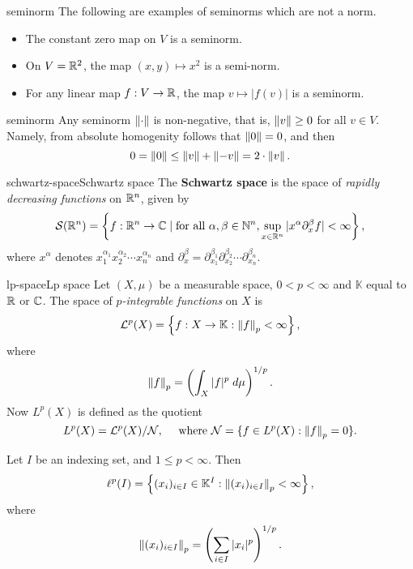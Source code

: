 \begin{example}{seminorm}
    The following are examples of seminorms which are not a norm.
    \begin{itemize}
        \item The constant zero map on $V$ is a seminorm.
        \item On $V = \mathbb{R}^2$, the map $(x, y) \mapsto x^2$ is a semi-norm.
        \item For any linear map $f : V \to \mathbb{R}$, the map $v \mapsto |f(v)|$ is a seminorm.
    \end{itemize}
\end{example}

\begin{example}{seminorm}
    Any seminorm $\left\|\cdot\right\|$ is non-negative, that is, $\left\|v\right\| \ge 0$ for all $v \in V$. Namely, from absolute homogenity follows that $\left\|0\right\| = 0$, and then
    \[ 0 = \left\|0\right\| \le \left\|v\right\| + \left\|-v\right\| = 2 \cdot \left\|v\right\| . \]
\end{example}

\begin{topic}{schwartz-space}{Schwartz space}
    The \textbf{Schwartz space} is the space of \textit{rapidly decreasing functions} on $\mathbb{R}^n$, given by
    \[ \mathcal{S}(\mathbb{R}^n) = \left\{ f : \mathbb{R}^n \to \mathbb{C} \;|\; \textup{for all } \alpha, \beta \in \mathbb{N}^n , \sup_{x \in \mathbb{R}^n} |x^\alpha \partial_x^\beta f| < \infty \right\} , \]
    where $x^\alpha$ denotes $x_1^{\alpha_1} x_2^{\alpha_2} \cdots x_n^{\alpha_n}$ and $\partial_x^\beta = \partial_{x_1}^{\beta_1} \partial_{x_2}^{\beta_2} \cdots \partial_{x_n}^{\beta_n}$.
\end{topic}

\begin{topic}{lp-space}{Lp space}
    Let $(X, \mu)$ be a measurable space, $0 < p < \infty$ and $\mathbb{K}$ equal to $\mathbb{R}$ or $\mathbb{C}$. The space of \textit{$p$-integrable functions} on $X$ is
    \[ \mathcal{L}^p(X) = \left\{ f : X \to \mathbb{K} : \left\|f\right\|_p < \infty \right\} , \]
    where
    \[ \left\|f\right\|_p = \left(\int_X |f|^p \; d\mu \right)^{1/p} . \]
    Now $L^p(X)$ is defined as the quotient
    \[ L^p(X) = \mathcal{L}^p(X) / \mathcal{N} , \quad \text{ where } \mathcal{N} = \{ f \in L^p(X) : \left\|f\right\|_p = 0 \} . \]
    
    Let $I$ be an indexing set, and $1 \le p < \infty$. Then
    \[ \ell^p(I) = \left\{ (x_i)_{i \in I} \in \mathbb{K}^I : \left\|(x_i)_{i \in I}\right\|_p < \infty \right\} , \]
    where
    \[ \left\|(x_i)_{i \in I}\right\|_p = \left(\sum_{i \in I} |x_i|^p \right)^{1/p} . \]
\end{topic}

